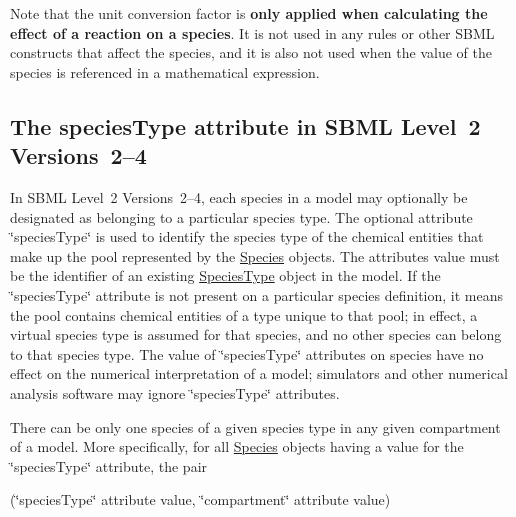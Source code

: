 Note that the unit conversion factor is {\bfseries only applied when calculating the effect of a reaction on a species}. It is not used in any rules or other S\+B\+ML constructs that affect the species, and it is also not used when the value of the species is referenced in a mathematical expression.\hypertarget{class_species_species-l2-type}{}\subsection{The species\+Type attribute in S\+B\+M\+L Level 2 Versions 2–4}\label{class_species_species-l2-type}
In S\+B\+ML Level~2 Versions~2--4, each species in a model may optionally be designated as belonging to a particular species type. The optional attribute \char`\"{}species\+Type\char`\"{} is used to identify the species type of the chemical entities that make up the pool represented by the \hyperlink{class_species}{Species} objects. The attribute\textquotesingle{}s value must be the identifier of an existing \hyperlink{class_species_type}{Species\+Type} object in the model. If the \char`\"{}species\+Type\char`\"{} attribute is not present on a particular species definition, it means the pool contains chemical entities of a type unique to that pool; in effect, a virtual species type is assumed for that species, and no other species can belong to that species type. The value of \char`\"{}species\+Type\char`\"{} attributes on species have no effect on the numerical interpretation of a model; simulators and other numerical analysis software may ignore \char`\"{}species\+Type\char`\"{} attributes.

There can be only one species of a given species type in any given compartment of a model. More specifically, for all \hyperlink{class_species}{Species} objects having a value for the \char`\"{}species\+Type\char`\"{} attribute, the pair \begin{center} (\char`\"{}species\+Type\char`\"{} attribute value, \char`\"{}compartment\char`\"{} attribute value) \end{center} 

